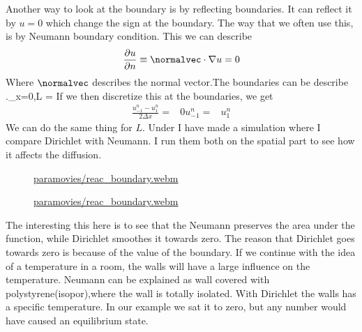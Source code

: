 \documentclass{book}
\begin{document}
Another way to look at the boundary is by reflecting boundaries. It can reflect it by $u=0$ which change the sign at the boundary. The way that we often use this, is by Neumann boundary condition. This we can describe
\begin{equation}
 \frac{\partial u}{\partial n} \equiv \normalvec\cdot\nabla u = 0
\end{equation}
Where $\normalvec$ describes the normal vector.The boundaries can be describe  
\left.\right\vert_{x=0,L} =
If we then discretize this at the boundaries, we get
\begin{align*}
\frac{u_{-1}^n - u_1^n}{2\Delta x} =& 0
u_{-1}^n =& u_1^n
\end{align*}
We can do the same thing for $L$.
Under I have made a simulation where I compare Dirichlet with Neumann. I run them
both on the spatial part to see how it affects the diffusion.


\begin{figure}[ht]
\begin{center}

\href{run:paramovies/reac_boundary.webm}{paramovies/reac_boundary.webm}

\href{run:paramovies/reac_boundary.webm}{paramovies/reac_boundary.webm}

\end{center}
\caption{}
\end{figure}


The interesting this here is to see that the Neumann preserves the area under the function, while Dirichlet smoothes it towards zero. The reason that Dirichlet goes towards zero is because of the value of the boundary. If we continue with the idea of a temperature in a room, the walls will have a large influence on the temperature. Neumann can be explained as wall covered with polystyrene(isopor),where the wall is totally isolated. With Dirichlet the walls has a specific temperature. In our example we sat it to zero, but any number would have caused an equilibrium state.  
\end{document}

